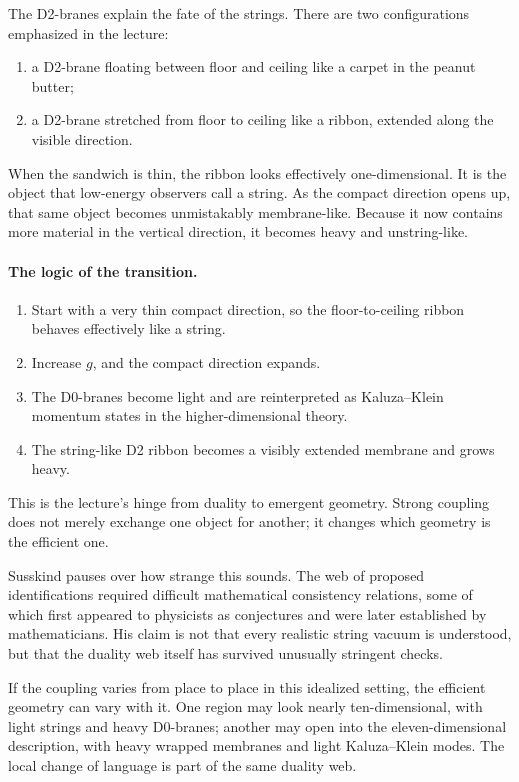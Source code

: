 The D2-branes explain the fate of the strings. There are two configurations emphasized in the lecture:
\begin{enumerate}
\item a D2-brane floating between floor and ceiling like a carpet in the peanut butter;
\item a D2-brane stretched from floor to ceiling like a ribbon, extended along the visible direction.
\end{enumerate}
When the sandwich is thin, the ribbon looks effectively one-dimensional. It is the object that low-energy observers call a string. As the compact direction opens up, that same object becomes unmistakably membrane-like. Because it now contains more material in the vertical direction, it becomes heavy and unstring-like.

\paragraph{The logic of the transition.}
\begin{enumerate}
\item Start with a very thin compact direction, so the floor-to-ceiling ribbon behaves effectively like a string.
\item Increase \(g\), and the compact direction expands.
\item The D0-branes become light and are reinterpreted as Kaluza--Klein momentum states in the higher-dimensional theory.
\item The string-like D2 ribbon becomes a visibly extended membrane and grows heavy.
\end{enumerate}
This is the lecture's hinge from duality to emergent geometry. Strong coupling does not merely exchange one object for another; it changes which geometry is the efficient one.

Susskind pauses over how strange this sounds. The web of proposed identifications required difficult mathematical consistency relations, some of which first appeared to physicists as conjectures and were later established by mathematicians. His claim is not that every realistic string vacuum is understood, but that the duality web itself has survived unusually stringent checks.

If the coupling varies from place to place in this idealized setting, the efficient geometry can vary with it. One region may look nearly ten-dimensional, with light strings and heavy D0-branes; another may open into the eleven-dimensional description, with heavy wrapped membranes and light Kaluza--Klein modes. The local change of language is part of the same duality web.

